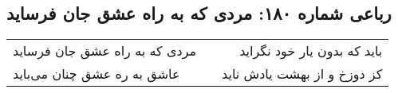 \begin{center}
\section*{رباعی شماره ۱۸۰: مردی که به راه عشق جان فرساید}
\label{sec:sh180}
\begin{longtable}{l p{0.5cm} r}
مردی که به راه عشق جان فرساید
&&
باید که بدون یار خود نگراید
\\
عاشق به ره عشق چنان می‌باید
&&
کز دوزخ و از بهشت یادش ناید
\\
\end{longtable}
\end{center}
